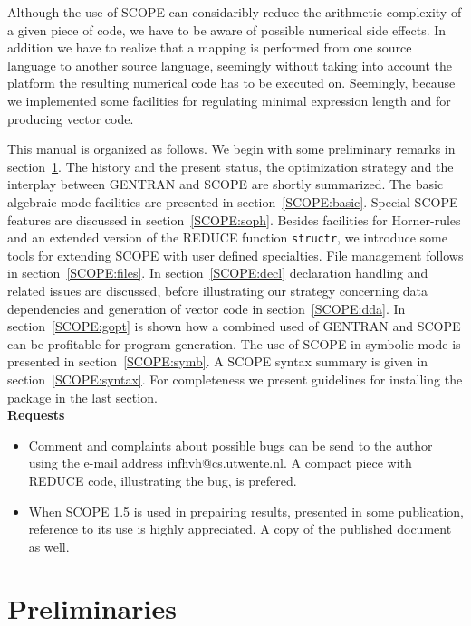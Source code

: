 Although the use of SCOPE can considaribly reduce the arithmetic complexity
of a given piece of code,
we have to be aware of possible numerical side effects. In addition we have
to realize that a mapping is performed from one source language to another
source language, seemingly without taking into account the platform the resulting
numerical code has to be executed on. Seemingly, because we implemented some
facilities for regulating minimal expression length  and for producing
vector code.

This manual is organized as follows. We begin with some preliminary remarks
in section~\ref{SCOPE:prel}. The history and the present status,
the optimization
strategy and the interplay between GENTRAN and SCOPE are shortly summarized.
The basic algebraic mode facilities are presented in
section~\ref{SCOPE:basic}. Special SCOPE features are discussed in
section~\ref{SCOPE:soph}. Besides facilities for Horner-rules and an extended
version of the REDUCE function {\tt structr}, we introduce some tools for
extending  SCOPE with user defined specialties. File management follows in
section~\ref{SCOPE:files}. In section~\ref{SCOPE:decl} declaration handling
and related issues are discussed, before illustrating our strategy concerning
data dependencies and generation of vector code in section~\ref{SCOPE:dda}.
In section~\ref{SCOPE:gopt} is shown how a combined used of GENTRAN and SCOPE
can be profitable for pro\-gram-ge\-ne\-ra\-ti\-on. The use of SCOPE in
symbolic mode is presented in section~\ref{SCOPE:symb}. A SCOPE syntax
summary is given in section~\ref{SCOPE:syntax}.
For completeness we present guidelines for installing the
package in the last section.\\

{\bf Requests}
\begin{itemize}
\item Comment and complaints about possible bugs can be send to the author
using the e-mail address infhvh@cs.utwente.nl. A compact piece with
REDUCE code, illustrating the bug, is prefered.
\item When SCOPE 1.5 is used in prepairing results, presented in some
publication, reference to its use is highly appreciated. A copy of the
published document as well.
\end{itemize}
\newpage

\section{Preliminaries}\label{SCOPE:prel}

